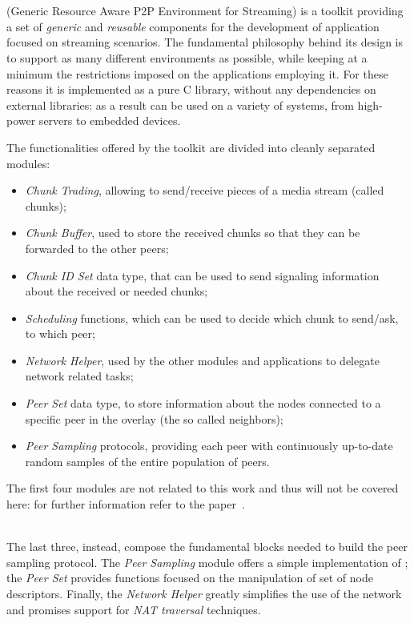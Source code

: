 \chapter{\grapes}
\grapes (Generic Resource Aware P2P Environment for Streaming) is a
toolkit providing a set of \textit{generic} and \textit{reusable}
components for the development of \ptop application focused on
streaming scenarios. The fundamental philosophy behind its design is
to support as many different environments as possible, while keeping at
a minimum the restrictions imposed on the applications employing it.
For these reasons it is implemented as a pure C library, without any dependencies
on external libraries: as a result \grapes can be used on a variety
of systems, from high-power servers to embedded devices.

The functionalities offered by the toolkit are divided into cleanly
separated modules:
\begin{itemize}
  \item \textit{Chunk Trading}, allowing to send/receive pieces of a
    media stream (called chunks);
  \item \textit{Chunk Buffer}, used to store the received chunks so
    that they can be forwarded to the other peers;
  \item \textit{Chunk ID Set} data type, that can be used to send
    signaling information about the received or needed chunks;
   \item \textit{Scheduling} functions, which can be used to decide
     which chunk to send/ask, to which peer;
   \item \textit{Network Helper}, used by the other modules and
     applications to delegate network related tasks;
   \item \textit{Peer Set} data type, to store information about the
     nodes connected to a specific peer in the overlay (the so called
     neighbors);
   \item \textit{Peer Sampling} protocols, providing each peer with
     continuously up-to-date random samples of the entire population
     of peers.
\end{itemize}

The first four modules are not related to this work and thus will not
be covered here: for further information refer to the
\grapes paper~\cite{GRAPES}.

\ \\
The last three, instead, compose the fundamental blocks needed to build
the \cloudcast peer sampling protocol. The \textit{Peer Sampling} module
offers a simple implementation of \cyclon; the \textit{Peer Set}
provides functions focused on the manipulation of set of node
descriptors. Finally, the \textit{Network Helper} greatly
simplifies the use of the network and promises support for
\textit{NAT traversal} techniques.


